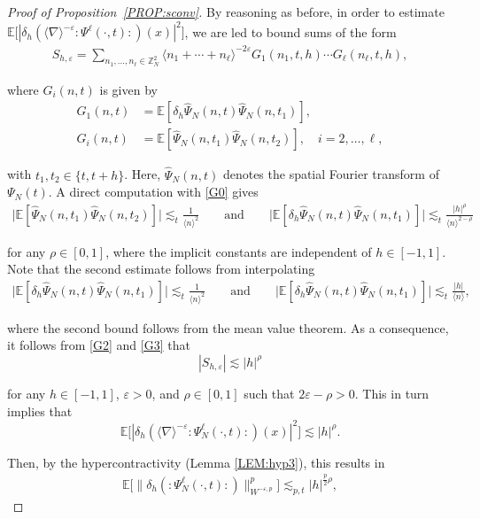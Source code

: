 \documentclass[letterpaper, 11pt,  reqno]{amsart}
\newcommand{\1}{\hspace{0.5mm}\text{I}\hspace{0.5mm}}
\newcommand{\noi}{\noindent}
\newcommand{\E}{\mathbb{E}}
\newcommand{\dl}{\delta}
\newcommand{\nb}{\nabla}
\newcommand{\eps}{\varepsilon}
\newcommand{\ft}{\widehat}
\renewcommand{\l}{\ell}
\newcommand{\les}{\lesssim}
\newcommand{\jb}[1]
{\langle #1 \rangle}
\numberwithin{equation}{section}
\numberwithin{theorem}{section}
\begin{document}
\begin{proof}[Proof of Proposition~\ref{PROP:sconv}]
By reasoning as before, in order to estimate 
$\mathbb{E} \big[|\dl_h (\jb{\nb}^{-\eps} : \! \Psi^{\ell} (\cdot, t ) \!:) (x) |^2 \big]$,
we are led to bound
sums of the form
\begin{align}
 S_{h, \eps} = \sum_{n_1, \ldots, n_{\ell} \in \mathbb{Z}^2_N} \langle n_1 + \cdots +
   n_{\ell}\rangle^{-2\eps} G_1 (n_1, t, h) \cdots G_{\ell} (n_{\ell}, t, h),  
\label{G2}
\end{align}


\noi
where $G_i(n, t)$ is given by 
\begin{align*}
G_1 (n, t) & =\E [\dl_h \ft \Psi_N (n, t)  \ft{\Psi}_N ( n, t_1)], \\
G_i (n, t) & =\E [\ft \Psi_N (n, t_1) \ft \Psi_N (n, t_2)], \quad i = 2, \dots, \l, 
\end{align*}


\noi
with $t_1, t_2 \in \{t, t+h\}$.
Here, $\ft \Psi_N (n, t)$ denotes the spatial Fourier transform of $\Psi_N(t)$.  
A direct computation with \eqref{G0} gives 
\begin{align} 
\big| \E [\ft \Psi_N (n, t_1) \ft \Psi_N (n, t_2)] \big| 
\les_t \frac{1}{\jb{n}^2}
\qquad \text{and}\qquad 
\big| \E [\dl_h \ft \Psi_N (n, t) \ft {\Psi}_N (n, t_1)] \big| 
\les_t \frac{|h|^{\rho}}{\jb{n}^{2 -\rho}} 
\label{G3}
\end{align}
   
   
\noi   
for any $\rho \in [0, 1]$,
where the implicit constants are independent of  $h \in [-1, 1]$.
Note that the second estimate follows
from interpolating 
\begin{align*} 
\big| \E [\dl_h \ft \Psi_N (n, t) \ft {\Psi}_N (n, t_1)] \big| 
\les_t \frac{1}{\jb{n}^2}
\qquad \text{and}
\qquad 
\big| \E [\dl_h \ft \Psi_N (n, t) \ft {\Psi}_N (n, t_1)] \big| 
\les_t \frac{|h|}{\jb{n}}, 
\end{align*}

\noi
where the second bound follows from the mean value theorem.
As a consequence, it follows from \eqref{G2} and \eqref{G3} that 
\[ | S_{h, \eps} | \les  |h|^\rho \]


\noi
for any $h \in [-1,1]$, $\eps > 0$,  and  $\rho \in [0, 1]$ such that $2 \eps -\rho >0$. 
This in turn implies that
\[ \E \big[| \dl_h ( \jb{\nb}^{-\eps} : \!\Psi^{\l}_N (\cdot, t) \!:) (x) |^2 \big]
   \les  |h|^{\rho}. \]


\noi
Then, by the hypercontractivity (Lemma \ref{LEM:hyp3}), 
this results in 
\begin{align*}
 \E \Big[\big\| \delta_h (: \!\Psi^{\ell}_N (\cdot, t) \!:) 
\big\|_{W^{- \eps,p}}^p \Big]
\les_{p, t} |h|^{\frac{p}{2}\rho}, 
\end{align*}


\end{proof}
\end{document}
